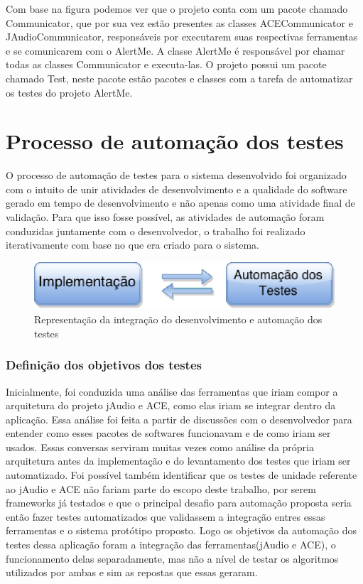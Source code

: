 Com base na figura podemos ver que o projeto conta com um pacote chamado Communicator, que por sua vez estão presentes as classes ACECommunicator e JAudioCommunicator, responsáveis por executarem suas respectivas ferramentas e se comunicarem com o AlertMe. A classe AlertMe é responsável por chamar todas as classes Communicator e executa-las. O projeto possui um pacote chamado Test, neste pacote estão pacotes e classes com a tarefa de automatizar os testes do projeto AlertMe. 

\section{Processo de automação dos testes}

O processo de automação de testes para o sistema desenvolvido foi organizado com o intuito de unir atividades de desenvolvimento e a qualidade do software gerado em tempo de desenvolvimento e não apenas como uma atividade final de validação. Para que isso fosse possível, as atividades de automação foram conduzidas juntamente com o desenvolvedor, o trabalho foi realizado iterativamente com base no que era criado para o sistema.

\begin{figure}[H]
	\centering
	\captionsetup{justification=centering,margin=2cm}
	\includegraphics[scale=0.80]{capitulos/validacao/figuras/automationTestProcess.eps}
	\caption{Representação da integração do desenvolvimento e automação dos testes}
	\label{fig:result-engajamento}
\end{figure}

\subsubsection{Definição dos objetivos dos testes}

Inicialmente, foi conduzida uma análise das ferramentas que iriam compor a arquitetura do projeto jAudio e ACE, como elas iriam se integrar dentro da aplicação. Essa análise foi feita a partir de discussões com o desenvolvedor para entender como esses pacotes de softwares funcionavam e de como iriam ser usados. Essas conversas serviram muitas vezes como análise da própria arquitetura antes da implementação e do levantamento dos testes que iriam ser automatizado. Foi possível também identificar que os testes de unidade referente ao jAudio e ACE não fariam parte do escopo deste trabalho, por serem frameworks já testados e que o principal desafio para automação proposta seria então fazer testes automatizados que validassem a integração entres essas ferramentas e o sistema protótipo proposto. Logo os objetivos da automação dos testes dessa aplicação foram a integração das ferramentas(jAudio e ACE), o funcionamento delas separadamente, mas não a nível de testar os algoritmos utilizados por ambas e sim as repostas que essas geraram.

